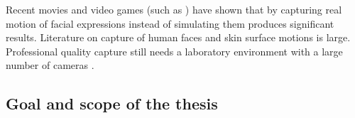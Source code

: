 



Recent movies and video games (such as \cite{rockstar2011noire}) have shown that by capturing real motion of facial expressions instead of simulating them produces significant results.
Literature on capture of human faces and skin surface motions is large. \cite{deng2007computer}
Professional quality capture still needs a laboratory environment with a large number of cameras \cite{winder2008technical,motionscan}.






\subsection{Goal and scope of the thesis}

